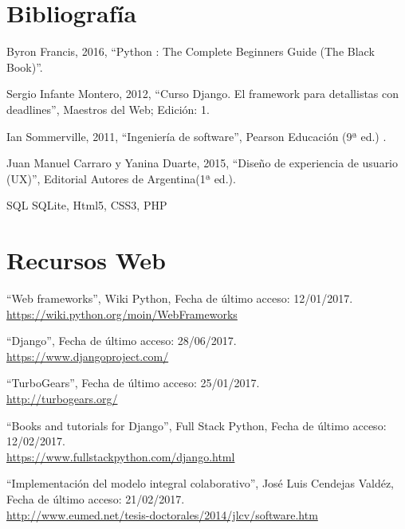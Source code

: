 \section{Bibliografía}




Byron Francis, 2016, ``Python : The Complete Beginners Guide (The Black Book)''. 


Sergio Infante Montero, 2012, ``Curso Django. El framework para detallistas con deadlines'', Maestros del Web; Edición: 1.

Ian Sommerville, 2011, ``Ingeniería de software'', Pearson Educación (9ª ed.) .

  Juan Manuel Carraro y Yanina Duarte, 2015, ``Diseño de experiencia de usuario (UX)'', Editorial Autores de Argentina(1ª ed.).






SQL SQLite, Html5, CSS3, PHP






\section{Recursos Web}

``Web frameworks'', Wiki Python, Fecha de último acceso: 12/01/2017.\\\href{https://wiki.python.org/moin/WebFrameworks}{https://wiki.python.org/moin/WebFrameworks}

``Django'', Fecha de último acceso: 28/06/2017.\\\href{https://www.djangoproject.com/}{https://www.djangoproject.com/}

``TurboGears'', Fecha de último acceso: 25/01/2017.\\\href{http://turbogears.org/}{http://turbogears.org/}


``Books and tutorials for Django'', Full Stack Python, Fecha de último acceso: 12/02/2017.\\\href{https://www.fullstackpython.com/django.html}{https://www.fullstackpython.com/django.html}

``Implementación del modelo integral colaborativo'', José Luis Cendejas Valdéz, Fecha de último acceso: 21/02/2017.\\\href{http://www.eumed.net/tesis-doctorales/2014/jlcv/software.htm}{http://www.eumed.net/tesis-doctorales/2014/jlcv/software.htm}


